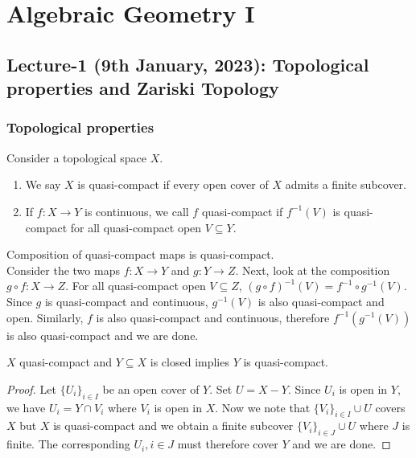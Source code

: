 \documentclass[oneside, 12pt, ]{scrbook}
\theoremstyle{theorem}
\begin{document}
\part{Algebraic Geometry I}

\chapter{Lecture-1 (9th January, 2023): Topological properties and Zariski Topology}
\section{Topological properties}

Consider a topological space $X$. 
\begin{definition}
\begin{enumerate}
\item We say $X$ is quasi-compact if every open cover of $X$ admits a finite subcover. 
\item If $f: X \rightarrow Y$ is continuous, we call $f$ quasi-compact if $f^{-1}(V)$ is quasi-compact for all quasi-compact open $V \subseteq Y$.
\end{enumerate}
\end{definition} 

\begin{exercise}
Composition of quasi-compact maps is quasi-compact.\\

Consider the two maps $f: X \rightarrow Y$ and $g: Y \rightarrow Z$. Next, look at the composition $g \circ f : X \rightarrow Z$. For all quasi-compact open $V \subseteq Z$, $(g \circ f)^{-1} (V) = f^{-1} \circ g^{-1} (V)$. Since $g$ is quasi-compact and continuous, $g^{-1}(V)$ is also quasi-compact and open. Similarly, $f$ is also quasi-compact and continuous, therefore $f^{-1}(g^{-1}(V))$ is also quasi-compact and we are done.
\end{exercise} 

\begin{lemma}
$X$ quasi-compact and $Y \subseteq X$ is closed implies $Y$ is quasi-compact.
\end{lemma}

\begin{proof}
Let $\{U_{i}\}_{i \in I}$ be an open cover of $Y$. Set $U = X - Y$. Since $U_{i}$ is open in $Y$, we have $U_{i} = Y \cap V_{i}$ where $V_{i}$ is open in $X$. Now we note that $\{V_{i}\}_{i \in I} \cup U$ covers $X$ but $X$ is quasi-compact and we obtain a finite subcover $\{V_{i}\}_{i \in J} \cup U$ where $J$ is finite. The corresponding $U_{i}, i \in J$ must therefore cover $Y$ and we are done.
\end{proof}
\end{document}
